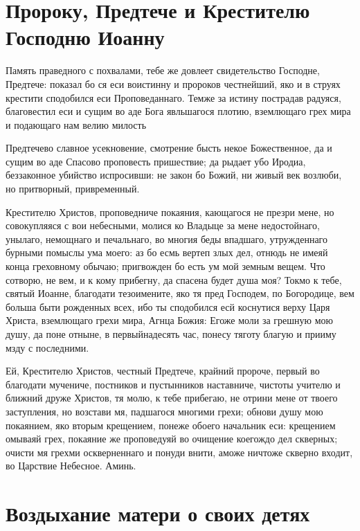 \section{Пророку, Предтече и Крестителю Господню Иоанну}
 


Память праведного с похвалами, тебе же довлеет свидетельство Господне, Предтече: показал бо ся еси воистинну и пророков честнейший, яко и в струях крестити сподобился еси Проповеданнаго. Темже за истину пострадав радуяся, благовестил еси и сущим во аде Бога явльшагося плотию, вземлющаго грех мира и подающаго нам велию милость




Предтечево славное усекновение, смотрение бысть некое Божественное, да и сущим во аде Спасово проповесть пришествие; да рыдает убо Иродиа, беззаконное убийство испросивши: не закон бо Божий, ни живый век возлюби, но притворный, привременный.




Крестителю Христов, проповедниче покаяния, кающагося не презри мене, но совокупляяся с вои небесными, молися ко Владыце за мене недостойнаго, унылаго, немощнаго и печальнаго, во многия беды впадшаго, утружденнаго бурными помыслы ума моего: аз бо есмь вертеп злых дел, отнюдь не имеяй конца греховному обычаю; пригвожден бо есть ум мой земным вещем. Что сотворю, не вем, и к кому прибегну, да спасена будет душа моя? Токмо к тебе, святый Иоанне, благодати тезоимените, яко тя пред Господем, по Богородице, вем больша быти рожденных всех, ибо ты сподобился есй коснутися верху Царя Христа, вземлющаго грехи мира, Агнца Божия: Егоже моли за грешную мою душу, да поне отныне, в первыйнадесять час, понесу тяготу благую и прииму мзду с последними. 

Ей, Крестителю Христов, честный Предтече, крайний пророче, первый во благодати мучениче, постников и пустынников наставниче, чистоты учителю и ближний друже Христов, тя молю, к тебе прибегаю, не отрини мене от твоего заступления, но возстави мя, падшагося многими грехи; обнови душу мою покаянием, яко вторым крещением, понеже обоего начальник еси: крещением омываяй грех, покаяние же проповедуяй во очищение коегождо дел скверных; очисти мя грехми оскверненнаго и понуди внити, аможе ничтоже скверно входит, во Царствие Небесное. Аминь.

\section{Воздыхание матери о своих детях}
 


